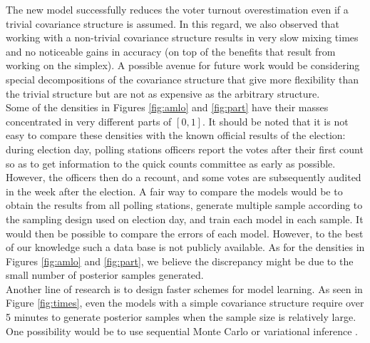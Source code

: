 \documentclass{article}
\begin{document}
The new model successfully reduces the voter turnout overestimation even if a trivial covariance structure is assumed. In this regard, we also observed that working with a non-trivial covariance structure results in very slow mixing times and no noticeable gains in accuracy (on top of the benefits that result from working on the simplex). A possible avenue for future work would be considering special decompositions of the covariance structure that give more flexibility than the trivial structure but are not as expensive as the arbitrary structure.
\\

Some of the densities in Figures \ref{fig:amlo} and \ref{fig:part} have their masses concentrated in very different parts of $[0, 1]$. It should be noted that it is not easy to compare these densities with the known official results of the election: during election day, polling stations officers report the votes after their first count so as to get information to the quick counts committee as early as possible. However, the officers then do a recount, and some votes are subsequently audited in the week after the election. A fair way to compare the models would be to obtain the results from all polling stations, generate multiple sample according to the sampling design used on election day, and train each model in each sample. It would then be possible to compare the errors of each model. However, to the best of our knowledge such a data base is not publicly available. As for the densities in Figures \ref{fig:amlo} and \ref{fig:part}, we believe the discrepancy might be due to the small number of posterior samples generated.
\\

Another line of research is to design faster schemes for model learning. As seen in Figure \ref{fig:times}, even the models with a simple covariance structure require over 5 minutes to generate posterior samples when the sample size is relatively large. One possibility would be to use sequential Monte Carlo \citep{stewart1992, gordon1993, kitagawa1996} or variational inference \citep{jordan1999, wainwright2008}.




\clearpage
\small


\end{document}
